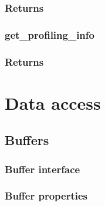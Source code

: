 \documentclass[letterpaper,10pt,english]{sphinxmanual}
\begin{document}
\subsubsection*{Returns}


\subsubsection{get\_profiling\_info}
\label{\detokenize{programming-interface/runtime/event:get-profiling-info}}
\begin{sphinxVerbatim}[commandchars=\\\{\}]
  
    
\end{sphinxVerbatim}
\subsubsection*{Returns}


\section{Data access}
\label{\detokenize{programming-interface/index:data-access}}

\subsection{Buffers}
\label{\detokenize{programming-interface/data/buffer:buffers}}\label{\detokenize{programming-interface/data/buffer::doc}}

\subsubsection{Buffer interface}
\label{\detokenize{programming-interface/data/buffer:buffer-interface}}

\subsubsection{Buffer properties}
\label{\detokenize{programming-interface/data/buffer:buffer-properties}}
\end{document}
